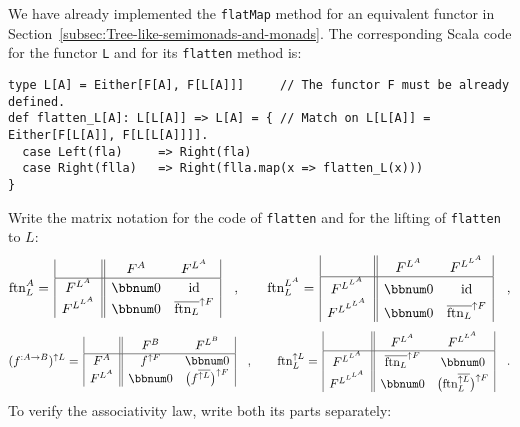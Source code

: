 We have already implemented the \lstinline!flatMap! method for an
equivalent functor in Section~\ref{subsec:Tree-like-semimonads-and-monads}.
The corresponding Scala code for the functor \lstinline!L! and for
its \lstinline!flatten! method is:
\begin{lstlisting}
type L[A] = Either[F[A], F[L[A]]]     // The functor F must be already defined.
def flatten_L[A]: L[L[A]] => L[A] = { // Match on L[L[A]] = Either[F[L[A]], F[L[L[A]]]].
  case Left(fla)     => Right(fla)
  case Right(flla)   => Right(flla.map(x => flatten_L(x)))
}
\end{lstlisting}
Write the matrix notation for the code of \lstinline!flatten! and
for the lifting of \lstinline!flatten! to $L$:
\[
\text{ftn}_{L}^{A}=\,\begin{array}{|c||cc|}
 & F^{A} & F^{L^{A}}\\
\hline F^{L^{A}} & \bbnum 0 & \text{id}\\
F^{L^{L^{A}}} & \bbnum 0 & \overline{\text{ftn}_{L}}^{\uparrow F}
\end{array}\quad,\quad\quad\text{ftn}_{L}^{L^{A}}=\,\begin{array}{|c||cc|}
 & F^{L^{A}} & F^{L^{L^{A}}}\\
\hline F^{L^{L^{A}}} & \bbnum 0 & \text{id}\\
F^{L^{L^{L^{A}}}} & \bbnum 0 & \overline{\text{ftn}_{L}}^{\uparrow F}
\end{array}\quad,
\]
\[
(f^{:A\rightarrow B})^{\uparrow L}=\,\begin{array}{|c||cc|}
 & F^{B} & F^{L^{B}}\\
\hline F^{A} & f^{\uparrow F} & \bbnum 0\\
F^{L^{A}} & \bbnum 0 & \big(f^{\overline{\uparrow L}}\big)^{\uparrow F}
\end{array}\quad,\quad\quad\text{ftn}_{L}^{\uparrow L}=\,\begin{array}{|c||cc|}
 & F^{L^{A}} & F^{L^{L^{A}}}\\
\hline F^{L^{L^{A}}} & \overline{\text{ftn}_{L}}^{\uparrow F} & \bbnum 0\\
F^{L^{L^{L^{A}}}} & \bbnum 0 & \big(\text{ftn}_{L}^{\overline{\uparrow L}}\big)^{\uparrow F}
\end{array}\quad.
\]
To verify the associativity law, write both its parts separately:
